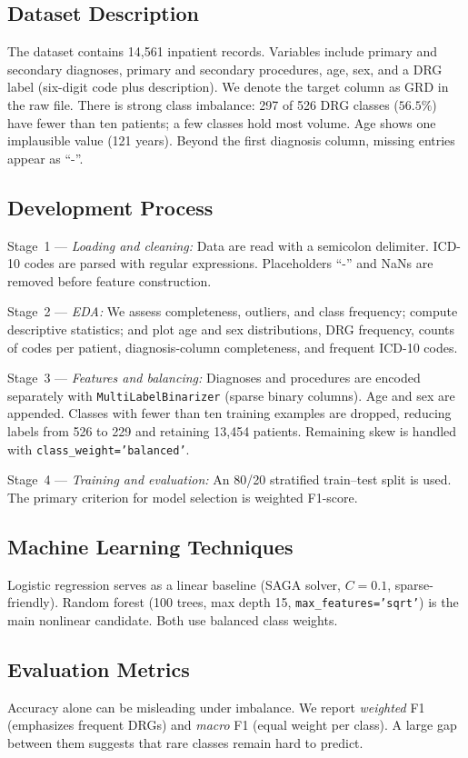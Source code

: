 \documentclass{ieeeaccess}
\begin{document}
\subsection{Dataset Description}
The dataset contains 14{,}561 inpatient records. Variables include primary and secondary diagnoses, primary and secondary procedures, age, sex, and a DRG label (six-digit code plus description). We denote the target column as GRD in the raw file. There is strong class imbalance: 297 of 526 DRG classes ($56.5\%$) have fewer than ten patients; a few classes hold most volume. Age shows one implausible value (121 years). Beyond the first diagnosis column, missing entries appear as ``-''.

\subsection{Development Process}
Stage~1 --- \emph{Loading and cleaning:} Data are read with a semicolon delimiter. ICD-10 codes are parsed with regular expressions. Placeholders ``-'' and NaNs are removed before feature construction.

Stage~2 --- \emph{EDA:} We assess completeness, outliers, and class frequency; compute descriptive statistics; and plot age and sex distributions, DRG frequency, counts of codes per patient, diagnosis-column completeness, and frequent ICD-10 codes.

Stage~3 --- \emph{Features and balancing:} Diagnoses and procedures are encoded separately with \texttt{MultiLabelBinarizer} (sparse binary columns). Age and sex are appended. Classes with fewer than ten training examples are dropped, reducing labels from 526 to 229 and retaining 13{,}454 patients. Remaining skew is handled with \texttt{class\_weight='balanced'}.

Stage~4 --- \emph{Training and evaluation:} An 80/20 stratified train--test split is used. The primary criterion for model selection is weighted F1-score.

\subsection{Machine Learning Techniques}
Logistic regression serves as a linear baseline (SAGA solver, $C=0.1$, sparse-friendly). Random forest (100 trees, max depth 15, \texttt{max\_features='sqrt'}) is the main nonlinear candidate. Both use balanced class weights.

\subsection{Evaluation Metrics}
Accuracy alone can be misleading under imbalance. We report \emph{weighted} F1 (emphasizes frequent DRGs) and \emph{macro} F1 (equal weight per class). A large gap between them suggests that rare classes remain hard to predict.
\end{document}
